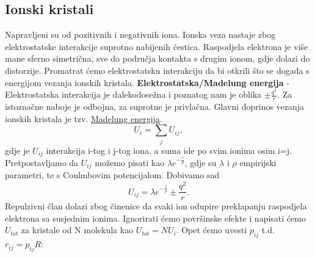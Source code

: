 \documentclass{article}
\numberwithin{equation}{section}
\begin{document}
\subsection{Ionski kristali}
Napravljeni su od pozitivnih i negativnih iona. Ionska veza nastaje zbog elektrostatske interakcije suprotno nabijenih čestica. Raspodjela elektrona je više mane sferno simetrična, sve do područja kontakta s drugim ionom, gdje dolazi do distorzije. Promatrat ćemo elektrostatsku interakciju da bi otkrili što se događa s energijom vezanja ionskih kristala.
\vfill
\textbf{Elektrostatska/Madelung energija} - Elektrostatska interakcija je dalekodosežna i poznatog nam je oblika $\pm \frac{q^2}{r}$. Za istoznačne naboje je odbojna, za suprotne je privlačna. Glavni doprinos vezanja ionskih kristala je tzv. \underline{Madelung energija}.
\begin{equation}
    U_i=\sum_j U_{ij},
\end{equation}
gdje je $U_{ij}$ interakcija i-tog i j-tog iona, a suma ide po svim ionima osim i=j. Pretpostavljamo da $U_{ij}$ možemo pisati kao $\lambda e^{-\frac{r}{\rho}}$, gdje su $\lambda$ i $\rho$ empirijski parametri, te s Coulmbovim potencijalom. Dobivamo sad 
\begin{equation}
    U_{ij}=\lambda e^{-\frac{r}{\rho}} \pm \frac{q^2}{r}.
    \label{EQ3_9}
\end{equation}
Repulzivni član dolazi zbog činenice da svaki ion odupire preklapanju raspodjela elektrona sa susjednim ionima. Ignorirati ćemo površinske efekte i napisati ćemo $U_{tot}$ za kristale od N molekula kao $U_{tot}=NU_i$. Opet ćemo uvesti $p_{ij}$ t.d. $r_{ij}=p_{ij}R$:
\end{document}
